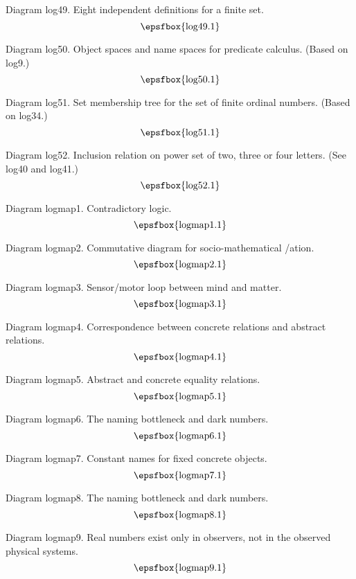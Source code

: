 Diagram log49. Eight independent definitions for a finite set.
$$
\centerline{\epsfbox{log49.1}}
$$

Diagram log50. Object spaces and name spaces for predicate calculus. (Based on
log9.)
$$
\centerline{\epsfbox{log50.1}}
$$

Diagram log51. Set membership tree for the set of finite ordinal numbers. (Based
on log34.)
$$
\centerline{\epsfbox{log51.1}}
$$

\filleject

Diagram log52. Inclusion relation on power set of two, three or four letters.
(See log40 and log41.)
$$
\centerline{\epsfbox{log52.1}}
$$

\secteject
\edef\SECTlogmap{\the\pageno}

Diagram logmap1. Contradictory logic.
$$
\centerline{\epsfbox{logmap1.1}}
$$

Diagram logmap2. Commutative diagram for socio-mathematical \synchronis/ation.
$$
\centerline{\epsfbox{logmap2.1}}
$$

Diagram logmap3. Sensor/motor loop between mind and matter.
$$
\centerline{\epsfbox{logmap3.1}}
$$

Diagram logmap4. Correspondence between concrete relations and abstract
relations.
$$
\centerline{\epsfbox{logmap4.1}}
$$

\filleject

Diagram logmap5. Abstract and concrete equality relations.
$$
\centerline{\epsfbox{logmap5.1}}
$$

Diagram logmap6. The naming bottleneck and dark numbers.
$$
\centerline{\epsfbox{logmap6.1}}
$$

Diagram logmap7. Constant names for fixed concrete objects.
$$
\centerline{\epsfbox{logmap7.1}}
$$

Diagram logmap8. The naming bottleneck and dark numbers.
$$
\centerline{\epsfbox{logmap8.1}}
$$

\filleject

Diagram logmap9. Real numbers exist only in observers, not in the observed
physical systems.
$$
\centerline{\epsfbox{logmap9.1}}
$$

\secteject
\edef\SECTmap{\the\pageno}

